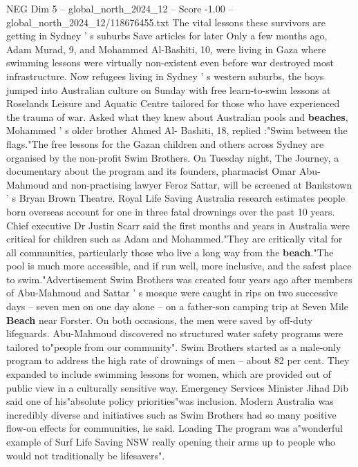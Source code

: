 \begin{textsample}{NEG Dim 5 – global\_north\_2024\_12 – Score -1.00 – global\_north\_2024\_12/118676455.txt}  \label{ex:f5_neg_337}
The vital lessons these survivors are getting in Sydney ' s suburbs Save articles for later Only a few months ago, Adam Murad, 9, and Mohammed Al-Bashiti, 10, were living in Gaza where swimming lessons were virtually non-existent even before war destroyed most infrastructure.
Now refugees living in Sydney ' s western suburbs, the boys jumped into Australian culture on Sunday with free learn-to-swim lessons at Roselands Leisure and Aquatic Centre tailored for those who have experienced the trauma of war.
Asked what they knew about Australian pools and \textbf{beaches}, Mohammed ' s older brother Ahmed Al- Bashiti, 18, replied :"Swim between the flags."The free lessons for the Gazan children and others across Sydney are organised by the non-profit Swim Brothers.
On Tuesday night, The Journey, a documentary about the program and its founders, pharmacist Omar Abu-Mahmoud and non-practising lawyer Feroz Sattar, will be screened at Bankstown ' s Bryan Brown Theatre.
Royal Life Saving Australia research estimates people born overseas account for one in three fatal drownings over the past 10 years.
Chief executive Dr Justin Scarr said the first months and years in Australia were critical for children such as Adam and Mohammed."They are critically vital for all communities, particularly those who live a long way from the \textbf{beach}."The pool is much more accessible, and if run well, more inclusive, and the safest place to swim."Advertisement Swim Brothers was created four years ago after members of Abu-Mahmoud and Sattar ' s mosque were caught in rips on two successive days -- seven men on one day alone -- on a father-son camping trip at Seven Mile \textbf{Beach} near Forster.
On both occasions, the men were saved by off-duty lifeguards.
Abu-Mahmoud discovered no structured water safety programs were tailored to"people from our community".
Swim Brothers started as a male-only program to address the high rate of drownings of men -- about 82 per cent.
They expanded to include swimming lessons for women, which are provided out of public view in a culturally sensitive way.
Emergency Services Minister Jihad Dib said one of his"absolute policy priorities"was inclusion.
Modern Australia was incredibly diverse and initiatives such as Swim Brothers had so many positive flow-on effects for communities, he said.
Loading The program was a"wonderful example of Surf Life Saving NSW really opening their arms up to people who would not traditionally be lifesavers".

\end{textsample}
